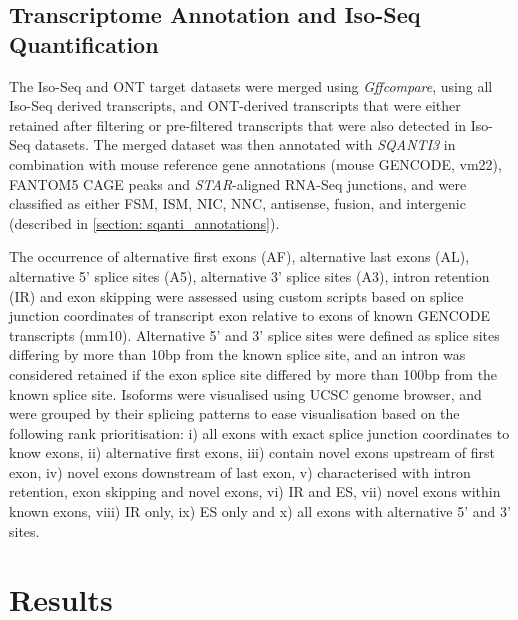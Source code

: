 \subsection{Transcriptome Annotation and Iso-Seq Quantification}
The Iso-Seq and ONT target datasets were merged using \textit{Gffcompare}, using all Iso-Seq derived transcripts, and ONT-derived transcripts that were either retained after filtering or pre-filtered transcripts that were also detected in Iso-Seq datasets. The merged dataset was then annotated with \textit{SQANTI3} in combination with mouse reference gene annotations (mouse GENCODE, vm22), FANTOM5 CAGE peaks and \textit{STAR}-aligned RNA-Seq junctions, and were classified as either FSM, ISM, NIC, NNC, antisense, fusion, and intergenic (described in \cref{section: sqanti_annotations}). 

The occurrence of alternative first exons (AF), alternative last exons (AL), alternative 5' splice sites (A5), alternative 3' splice sites (A3), intron retention (IR) and exon skipping were assessed using custom scripts based on splice junction coordinates of transcript exon relative to exons of known GENCODE transcripts (mm10). Alternative 5' and 3' splice sites were defined as splice sites differing by more than 10bp from the known splice site, and an intron was considered retained if the exon splice site differed by more than 100bp from the known splice site. Isoforms were visualised using UCSC genome browser, and were grouped by their splicing patterns to ease visualisation based on the following rank prioritisation: i) all exons with exact splice junction coordinates to know exons, ii) alternative first exons, iii) contain novel exons upstream of first exon, iv) novel exons downstream of last exon, v) characterised with intron retention, exon skipping and novel exons, vi) IR and ES, vii) novel exons within known exons, viii) IR only, ix) ES only and x) all exons with alternative 5' and 3' sites.


\newpage
\section{Results}
